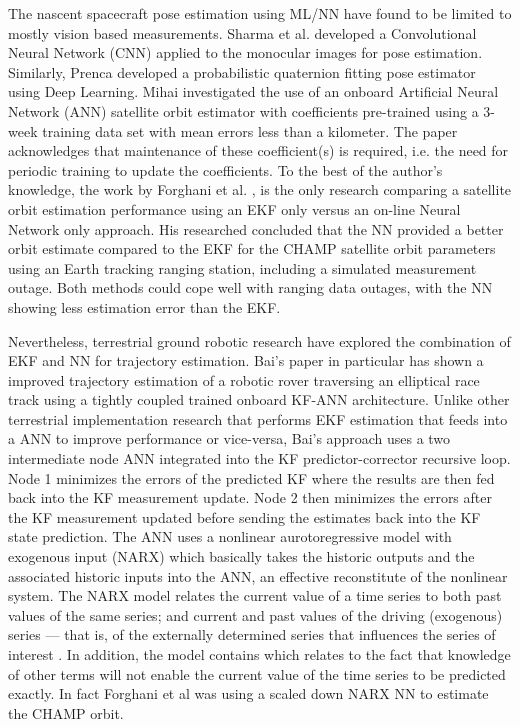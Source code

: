 The nascent spacecraft pose estimation using ML/NN have found to be limited to mostly vision based measurements. Sharma et al. \cite{sharmePoseNonCYYb} developed a Convolutional Neural Network (CNN) applied to the monocular images for pose estimation. Similarly, Prenca \cite{prencaDlPosePhotorealistic19} developed a probabilistic quaternion fitting pose estimator using Deep Learning. Mihai \cite{mihaiPoseAnn20} investigated the use of an onboard Artificial Neural Network (ANN) satellite orbit estimator with coefficients pre-trained using a 3-week training data set with mean errors less than a kilometer. The paper acknowledges that maintenance of these coefficient(s) is required, i.e. the need for periodic training to update the coefficients. To the best of the author's knowledge, the work by Forghani et al. \cite{ForghaniOrbitNN11},  is the only research comparing a satellite orbit estimation performance using an EKF only versus an on-line Neural Network only approach. His researched concluded that the NN provided a better orbit estimate compared to the EKF for the CHAMP satellite orbit parameters using an Earth tracking ranging station, including a simulated measurement outage. Both methods could cope well with ranging data outages, with the NN showing less estimation error than the EKF.

Nevertheless, terrestrial ground robotic research have explored the combination of EKF and NN for trajectory estimation. Bai's \cite{baiKf20} paper in particular has shown a improved trajectory estimation of a robotic rover traversing an elliptical race track using a tightly coupled trained onboard KF-ANN architecture. Unlike other terrestrial implementation research that performs EKF estimation that feeds into a ANN to improve performance or vice-versa, Bai's approach uses a two intermediate node ANN integrated into the KF predictor-corrector recursive loop. Node 1 minimizes the errors of the predicted KF where the results are then fed back into the KF measurement update. Node 2 then minimizes the errors after the KF measurement updated before sending the estimates back into the KF state prediction. The ANN uses a nonlinear aurotoregressive model with exogenous input (NARX) which basically takes the historic outputs and the associated historic inputs into the ANN, an effective reconstitute of the nonlinear system. The NARX model relates the current value of a time series to both past values of the same series; and current and past values of the driving (exogenous) series — that is, of the externally determined series that influences the series of interest \cite{menezesNarx20083335, baiCompund19}. In addition, the model contains which relates to the fact that knowledge of other terms will not enable the current value of the time series to be predicted exactly. In fact Forghani et al \cite{ForghaniOrbitNN11} was using a scaled down NARX NN to estimate the CHAMP orbit.     

